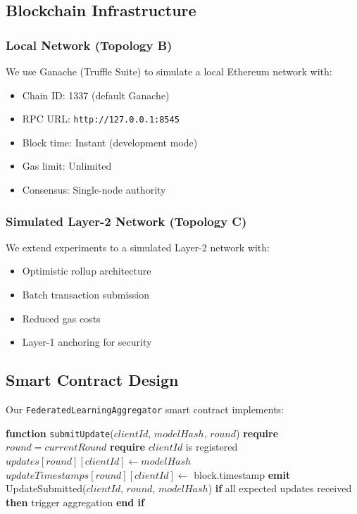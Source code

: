 \documentclass[12pt,a4paper,onecolumn]{article}
\begin{document}
\subsection{Blockchain Infrastructure}

\subsubsection{Local Network (Topology B)}

We use Ganache (Truffle Suite) to simulate a local Ethereum network with:
\begin{itemize}
    \item Chain ID: 1337 (default Ganache)
    \item RPC URL: \texttt{http://127.0.0.1:8545}
    \item Block time: Instant (development mode)
    \item Gas limit: Unlimited
    \item Consensus: Single-node authority
\end{itemize}

\subsubsection{Simulated Layer-2 Network (Topology C)}

We extend experiments to a simulated Layer-2 network with:
\begin{itemize}
    \item Optimistic rollup architecture
    \item Batch transaction submission
    \item Reduced gas costs
    \item Layer-1 anchoring for security
\end{itemize}

\subsection{Smart Contract Design}

Our \texttt{FederatedLearningAggregator} smart contract implements:

\begin{algorithm}[t]
\caption{Smart Contract Update Submission}
\label{alg:contract_update}
\begin{algorithmic}[1]
\STATE \textbf{function} \texttt{submitUpdate}($clientId$, $modelHash$, $round$)
\STATE \textbf{require} $round = currentRound$
\STATE \textbf{require} $clientId$ is registered
\STATE $updates[round][clientId] \gets modelHash$
\STATE $updateTimestamps[round][clientId] \gets$ block.timestamp
\STATE \textbf{emit} UpdateSubmitted($clientId$, $round$, $modelHash$)
\STATE \textbf{if} all expected updates received \textbf{then}
\STATE \quad trigger aggregation
\STATE \textbf{end if}
\end{algorithmic}
\end{algorithm}
\end{document}
